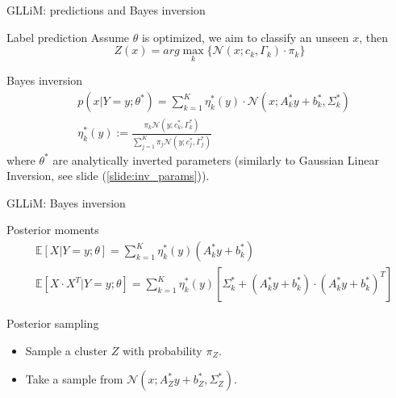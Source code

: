 	
	
	\begin{frame}{GLLiM: predictions and Bayes inversion}
	\begin{block}{Label prediction}
	Assume $\theta$ is optimized, we aim to classify an unseen $x$, then
	\[ Z(x) = arg\max_k \{ \mathcal{N}(x;c_k, \Gamma_k) \cdot \pi_k \} \]
	\vspace{-0.6cm}
	\end{block}
	\begin{block}{Bayes inversion}
	\vspace{-0.5cm}
	\begin{align*}
	&p(x|Y=y; \theta^*) = \sum_{k=1}^K \eta_k^*(y) \cdot \mathcal{N}(x;A_k^* y + b_k^*, \Sigma_k^*) \\ 
	&\eta_k^*(y) := \frac{\pi_k \mathcal{N}(y;c_k^*, \Gamma_k^*)}{ \sum_{j=1}^K \pi_j \mathcal{N}(y;c_j^*, \Gamma_j^*)} 
	\end{align*}
	where $\theta^*$ are analytically inverted parameters (similarly to Gaussian Linear Inversion, see slide (\ref{slide:inv_params})).
	\end{block}
	\end{frame}
	
	\begin{frame}{GLLiM: Bayes inversion}
	\begin{block}{Posterior moments}
	\begin{align*}
	&\mathbb{E}[X|Y=y;\theta] = \sum_{k=1}^K \eta_k^*(y) (A_k^* y + b_k^*) \\
	& \mathbb{E}[X\cdot X^T|Y=y;\theta] = \sum_{k=1}^K \eta_k^*(y) [\Sigma_k^* + (A_k^* y + b_k^*)\cdot(A_k^* y + b_k^*)^T]
	\end{align*}
	\end{block}
	
	\begin{block}{Posterior sampling}
	\begin{itemize}
	\item Sample a cluster $Z$ with probability $\pi_Z$.
	\item Take a sample from $\mathcal{N}(x;A_Z^* y + b_Z^*, \Sigma_Z^*)$.
	\end{itemize}
	\end{block}
	\end{frame}
	
